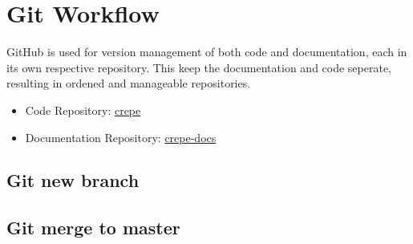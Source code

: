 \documentclass{projdoc}
\begin{document}
\section{Git Workflow}

GitHub is used for version management of both code and documentation, each in its own respective repository.
This keep the documentation and code seperate, resulting in ordened and manageable repositories. 

\begin{itemize}
	\item Code Repository: \href{https://github.com/lonkaars/crepe}{crepe}
	\item Documentation Repository: \href{https://github.com/lonkaars/crepe-docs}{crepe-docs}
\end{itemize}

\subsection{Git new branch}
\subsection{Git merge to master}
\newpage
\end{document}
